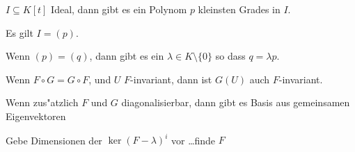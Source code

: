 \documentclass[a4,11pt]{article}
\begin{document}
\vspace*{-17mm}
{
\kopf
}


\begin{aufgabe}[4 Punkte]
$I \subseteq K[t]$ Ideal, dann gibt es ein Polynom $p$ kleinsten
Grades in $I$.

Es gilt $I = (p)$.

Wenn $(p) = (q)$, dann gibt es ein $\lambda \in K \setminus \{0\}$ so
dass $q = \lambda p$.

\end{aufgabe}

\begin{aufgabe}[4 Punkte]
Wenn $F \circ G = G \circ F$, und $U$ $F$-invariant, dann ist $G(U)$
auch $F$-invariant.

Wenn zus"atzlich $F$ und $G$ diagonalisierbar, dann gibt es Basis aus
gemeinsamen Eigenvektoren
\end{aufgabe}


\begin{aufgabe}[4 Punkte]
Gebe Dimensionen der $\ker (F -\lambda)^i$ vor \ldots finde $F$  
\end{aufgabe}
\end{document}
